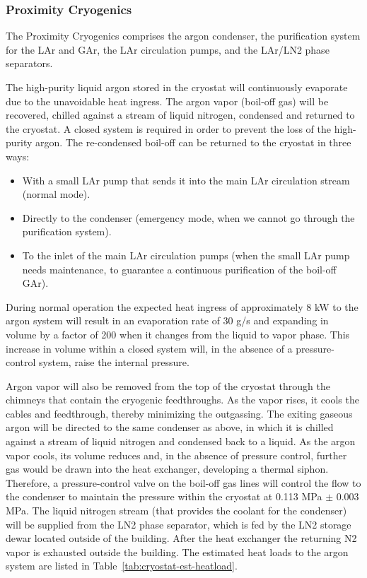 \subsubsection{Proximity Cryogenics}

The Proximity Cryogenics comprises the argon condenser, the purification system for the LAr and GAr, the LAr circulation pumps, and the LAr/LN2 phase separators.

 

The high-purity liquid argon stored in the cryostat will continuously evaporate due to the unavoidable heat ingress. The argon vapor (boil-off gas) will be recovered, chilled against a stream of liquid nitrogen, condensed and returned to the cryostat. A closed system is required in order to prevent the loss of the high-purity argon. The re-condensed boil-off can be returned to the cryostat in three ways:
\begin{itemize}
\item With a small LAr pump that sends it into the main LAr circulation stream (normal mode).
\item Directly to the condenser (emergency mode, when we cannot go through the purification system).
\item To the inlet of the main LAr circulation pumps (when the small LAr pump needs maintenance, to guarantee a continuous purification of the boil-off GAr).
\end{itemize}

During normal operation the expected heat ingress of approximately 8 kW to the argon system will result in an evaporation rate of 30 g/s and expanding in volume by a factor of 200 when it changes from the liquid to vapor phase. This increase in volume within a closed system will, in the absence of a pressure-control system, raise the internal pressure.

Argon vapor will also be removed from the top of the cryostat through the chimneys that contain the cryogenic feedthroughs. As the vapor rises, it cools the cables and feedthrough, thereby minimizing the outgassing. The exiting gaseous argon will be directed to the same condenser as above, in which it is chilled against a stream of liquid nitrogen and condensed back to a liquid. As the argon vapor cools, its volume reduces and, in the absence of pressure control, further gas would be drawn into the heat exchanger, developing a thermal siphon. Therefore, a pressure-control valve on the boil-off gas lines will control the flow to the condenser to maintain the pressure within the cryostat at 0.113 MPa $\pm$ 0.003 MPa. The liquid nitrogen stream (that provides the coolant for the condenser) will be supplied from the LN2 phase separator, which is fed by the LN2 storage dewar located outside of the building. After the heat exchanger the returning N2 vapor is exhausted outside the building. The estimated heat loads to the argon system are listed in Table~\ref{tab:cryostat-est-heatload}.

